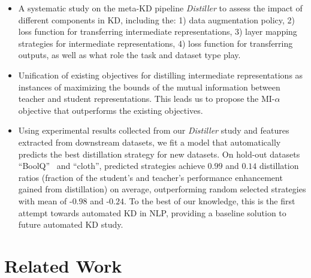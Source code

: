 \documentclass[11pt]{article}
\begin{document}
\begin{itemize}
    \item A systematic study on the meta-KD pipeline \emph{Distiller} to assess the impact of different components in KD, including the: 1) data augmentation policy, 2) loss function for transferring intermediate representations, 3) layer mapping strategies for intermediate representations, 4) loss function for transferring outputs, as well as what role the task and dataset type play.
    \item Unification of existing objectives for distilling intermediate representations as instances of maximizing the bounds of the mutual information between teacher and student representations. 
    This leads us to propose  
    the MI-$\alpha$ objective that outperforms the existing objectives.
    \item Using experimental results collected from our \emph{Distiller} study and features extracted from downstream datasets, we fit a model that automatically predicts the best distillation strategy for new datasets. On hold-out datasets ``BoolQ''~\citep{wang2019superglue} and ``cloth'',  predicted strategies achieve $0.99$ and $0.14$ distillation ratios (fraction of the student's and teacher's performance enhancement gained from distillation) on average, outperforming random selected strategies with mean of -$0.98$ and -$0.24$. To the best of our knowledge, this is the first attempt towards automated KD in NLP, providing a baseline solution to future automated KD study.
\end{itemize}
\section{Related Work}
\label{related work}
\end{document}
